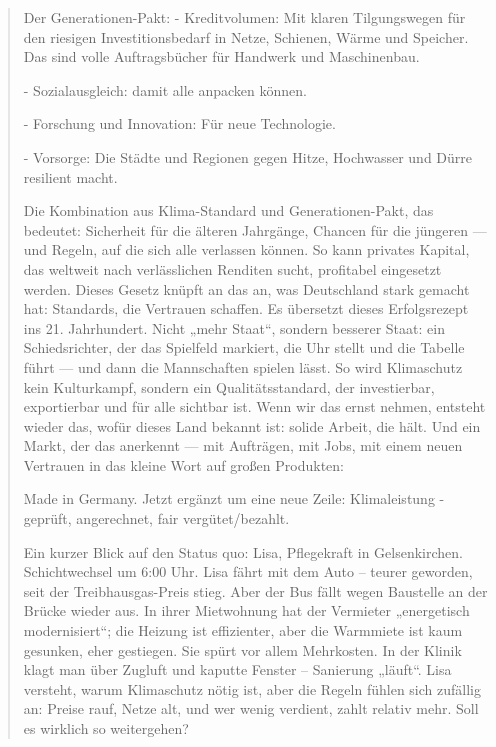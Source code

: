 \documentclass[12pt,a4paper]{scrartcl}
\begin{document}
\begin{quote}
 Der Generationen-Pakt:
- Kreditvolumen: Mit klaren Tilgungswegen für den riesigen Investitionsbedarf in Netze, Schienen, Wärme und Speicher. Das sind volle Auftragsbücher für Handwerk und Maschinenbau.

- Sozialausgleich: damit alle anpacken können. 

- Forschung und Innovation: Für neue Technologie.

- Vorsorge: Die Städte und Regionen gegen Hitze, Hochwasser und Dürre resilient macht.

  Die Kombination aus Klima-Standard und Generationen-Pakt, das bedeutet: Sicherheit für die älteren Jahrgänge, Chancen für die jüngeren --- und Regeln, auf die sich alle verlassen können. So kann privates Kapital, das weltweit nach verlässlichen Renditen sucht, profitabel eingesetzt werden. Dieses Gesetz knüpft an das an, was Deutschland stark gemacht hat: Standards, die Vertrauen schaffen. Es übersetzt dieses Erfolgsrezept ins 21. Jahrhundert. Nicht „mehr Staat“, sondern besserer Staat: ein Schiedsrichter, der das Spielfeld markiert, die Uhr stellt und die Tabelle führt --- und dann die Mannschaften spielen lässt. So wird Klimaschutz kein Kulturkampf, sondern ein Qualitätsstandard, der investierbar, exportierbar und für alle sichtbar ist. Wenn wir das ernst nehmen, entsteht wieder das, wofür dieses Land bekannt ist: solide Arbeit, die hält. Und ein Markt, der das anerkennt --- mit Aufträgen, mit Jobs, mit einem neuen Vertrauen in das kleine Wort auf großen Produkten:

 Made in Germany. Jetzt ergänzt um eine neue Zeile: Klimaleistung - geprüft, angerechnet, fair vergütet/bezahlt.

Ein kurzer Blick auf den Status quo:
 Lisa, Pflegekraft in Gelsenkirchen. Schichtwechsel um 6:00 Uhr. Lisa fährt mit dem Auto -- teurer geworden, seit der Treibhausgas-Preis stieg. Aber der Bus fällt wegen Baustelle an der Brücke wieder aus. In ihrer Mietwohnung hat der Vermieter „energetisch modernisiert“; die Heizung ist effizienter, aber die Warmmiete ist kaum gesunken, eher gestiegen. Sie spürt vor allem Mehrkosten. In der Klinik klagt man über Zugluft und kaputte Fenster -- Sanierung „läuft“. Lisa versteht, warum Klimaschutz nötig ist, aber die Regeln fühlen sich zufällig an: Preise rauf, Netze alt, und wer wenig verdient, zahlt relativ mehr. Soll es wirklich so weitergehen?


\end{quote}
\end{document}
